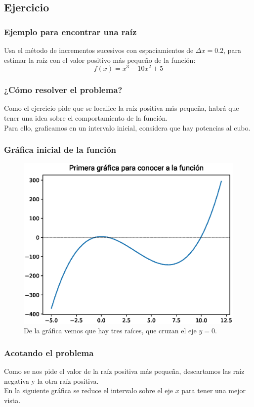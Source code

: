 \subsection{Ejercicio}
\begin{frame}
\frametitle{Ejemplo para encontrar una raíz}
Usa el método de incrementos sucesivos con espaciamientos de $\Delta x= 0.2$, para estimar la raíz con el valor positivo más pequeño de la función:
\[ f(x) = x^{3} - 10 x^{2} + 5\]
\end{frame}
\begin{frame}
\frametitle{¿Cómo resolver el problema?}
Como el ejercicio pide que se localice la raíz positiva más pequeña, habrá que tener una idea sobre el comportamiento de la función.
\\
\bigskip
Para ello, graficamos en un intervalo inicial, considera que hay potencias al cubo.
\end{frame}
\begin{frame}
\frametitle{Gráfica inicial de la función}
\begin{figure}
	\centering
	\includegraphics[scale=0.5]{Imagenes/aprox_sucesivas_01.eps}
	\caption{De la gráfica vemos que hay tres raíces, que cruzan el eje $y=0$.} 
\end{figure}
\end{frame}
\begin{frame}
\frametitle{Acotando el problema}
Como se nos pide el valor de la raíz positiva más pequeña, descartamos las raíz negativa y la otra raíz positiva.
\\
En la siguiente gráfica se reduce el intervalo sobre el eje $x$ para tener una mejor vista.
\end{frame}
